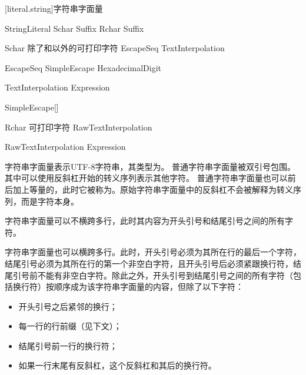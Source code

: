 [literal.string]{字符串字面量}

\begin{bnf}{StringLiteral}
     Schar\bnfs {} Suffix\bnfq \br
    \bnfp {} Rchar\bnfs {} \bnfp Suffix\bnfq
\end{bnf}

\begin{bnf}{Schar}
    \textnormal{除了\terminal{\textbackslash}和以外的可打印字符} \br
    EscapeSeq \br
    TextInterpolation
\end{bnf}

\begin{bnf}{EscapeSeq}
    \terminal{\textbackslash} SimpleEscape \br
     HexadecimalDigit\bnfp \terminal{\}}
\end{bnf}

\begin{bnf}{TextInterpolation}
    \terminal{\textbackslash{}(} Expression \terminal{)}
\end{bnf}

\begin{bnf}{SimpleEscape}[\oneof]
\end{bnf}

\begin{bnf}{Rchar}
    \textnormal{可打印字符} \br
    RawTextInterpolation
\end{bnf}

\begin{bnf}{RawTextInterpolation}
    \terminal{\textbackslash} \bnfp \terminal{(}  Expression \terminal{)}
\end{bnf}

\pnum
字符串字面量表示UTF-8字符串，其类型为。
普通字符串字面量被双引号包围。其中可以使用反斜杠开始的转义序列表示其他字符。
普通字符串字面量也可以前后加上等量的，此时它被称为。原始字符串字面量中的反斜杠不会被解释为转义序列，而是字符本身。

\pnum
字符串字面量可以不横跨多行，此时其内容为开头引号和结尾引号之间的所有字符。

\pnum
字符串字面量也可以横跨多行。此时，开头引号必须为其所在行的最后一个字符，结尾引号必须为其所在行的第一个非空白字符，且开头引号后必须紧跟换行符，结尾引号前不能有非空白字符。除此之外，开头引号到结尾引号之间的所有字符（包括换行符）按顺序成为该字符串字面量的内容，但除了以下字符：

\begin{itemize}
    \item 开头引号之后紧邻的换行；
    \item 每一行的行前缀（见下文）；
    \item 结尾引号前一行的换行符；
    \item 如果一行末尾有反斜杠，这个反斜杠和其后的换行符。
\end{itemize}

